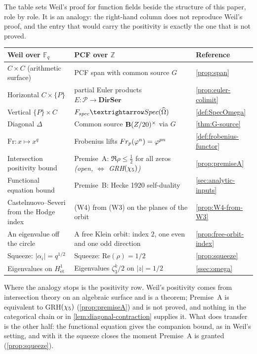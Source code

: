 The table sets Weil's proof for function fields beside the structure of this paper,
role by role.  It is an analogy: the right-hand column does not reproduce Weil's
proof, and the entry that would carry the positivity is exactly the one that is not
proved.
\begin{center}
\small
\begin{tabular}{@{}>{\raggedright\arraybackslash}p{}>{\raggedright\arraybackslash}p{}>{\raggedright\arraybackslash}p{}@{}}
\toprule
Weil over $\mathbb{F}_q$ & PCF over $\mathbb{Z}$ & Reference \\
\midrule
$C\times C$ (arithmetic surface)
  & PCF span with common source $G$
  & \cref{prop:span} \\
Horizontal $C\times\{P\}$
  & partial Euler products $E\colon\mathcal P\to\mathbf{DirSer}$
  & \cref{prop:euler-colimit} \\
Vertical $\{P\}\times C$
  & $F_{\mathrm{spec}}\to\mathrm{Spec}(\OmH)$
  & \cref{def:SpecOmega} \\
Diagonal $\Delta$
  & Common source $\mathbf{B}(Z/20)^{\times}$ via $G$
  & \cref{thm:G-source} \\
$\mathrm{Fr}\colon x\mapsto x^q$
  & Frobenius lifts $Fr_p(\varphi^n) = \varphi^{pn}$
  & \cref{def:frobenius-functor} \\
Intersection positivity bound
  & Premise~A: $\Re\rho\le\tfrac12$ for all zeros \emph{(open, $\Leftrightarrow$ GRH$(\chi_5)$)}
  & \cref{prop:premiseA} \\
Functional equation bound
  & Premise~B: Hecke 1920 self-duality
  & \cref{sec:analytic-inputs} \\
Castelnuovo--Severi from the Hodge index
  & \textup{(W4)} from \textup{(W3)} on the planes of the orbit
  & \cref{prop:W4-from-W3} \\
An eigenvalue off the circle
  & A free Klein orbit: index $2$, one even and one odd direction
  & \cref{prop:free-orbit-index} \\
Squeeze: $|\alpha_i|=q^{1/2}$
  & Squeeze: $\mathrm{Re}(\rho)=1/2$
  & \cref{prop:squeeze} \\
Eigenvalues on $H^1_{\mathrm{\acute{e}t}}$
  & Eigenvalues $\zeta_3^k/2$ on $|z|=1/2$
  & \cref{ssec:omega} \\
\bottomrule
\end{tabular}
\end{center}

Where the analogy stops is the positivity row.  Weil's positivity comes from
intersection theory on an algebraic surface and is a theorem; Premise~A is equivalent
to GRH$(\chi_5)$ (\cref{prop:premiseA}) and is not proved, and nothing in the categorical
chain or in \cref{lem:diagonal-contraction} supplies it.  What does transfer is the
other half: the functional equation gives the companion bound, as in Weil's setting,
and with it the squeeze closes the moment Premise~A is granted (\cref{prop:squeeze}).

